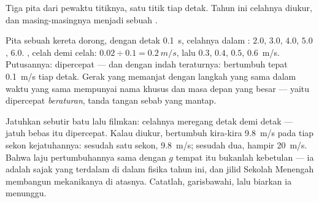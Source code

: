 \begin{omfigure}

{\small Tiga pita dari pewaktu titiknya, satu titik tiap detak. Tahun
ini celahnya diukur, dan masing-masingnya menjadi sebuah .}
\end{omfigure}

\begin{example}\label{ex:g9:uniform-varied-motion:worked}
Pita sebuah kereta dorong, dengan detak \qty{0.1}{s}, celahnya dalam
: $2.0$, $3.0$, $4.0$, $5.0$, $6.0$. , celah demi
celah: $0.02 \div 0.1 = \qty{0.2}{m/s}$, lalu $0.3$, $0.4$,
$0.5$, \qty{0.6}{m/s}. Putusannya: dipercepat --- dan dengan indah
teraturnya:  bertumbuh tepat \qty{0.1}{m/s} tiap detak.
Gerak yang  memanjat dengan langkah yang sama dalam waktu
yang sama mempunyai nama khusus dan masa depan yang besar --- yaitu
dipercepat \emph{beraturan}, tanda tangan sebab yang mantap.
\end{example}

\begin{example}\label{ex:g9:uniform-varied-motion:freefall}
Jatuhkan sebutir batu lalu filmkan: celahnya meregang detak demi detak
--- jatuh bebas itu dipercepat. Kalau diukur,  bertumbuh
kira-kira \qty{9.8}{m/s} pada tiap sekon kejatuhannya: sesudah satu
sekon, \qty{9.8}{m/s}; sesudah dua, hampir \qty{20}{m/s}. Bahwa laju
pertumbuhannya sama dengan $g$ tempat itu bukanlah kebetulan --- ia
adalah sajak yang terdalam di dalam fisika tahun ini, dan jilid
Sekolah Menengah membangun mekanikanya di atasnya. Catatlah,
garisbawahi, lalu biarkan ia menunggu.
\end{example}

